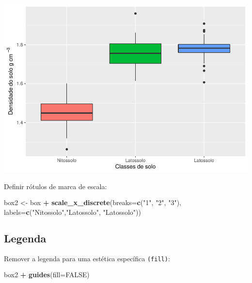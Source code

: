 \documentclass[
]{book}
\newenvironment{Shaded}{\begin{snugshade}}{\end{snugshade}}
\newcommand{\DataTypeTok}[1]{\textcolor[rgb]{0.13,0.29,0.53}{#1}}
\newcommand{\KeywordTok}[1]{\textcolor[rgb]{0.13,0.29,0.53}{\textbf{#1}}}
\newcommand{\NormalTok}[1]{#1}
\newcommand{\OperatorTok}[1]{\textcolor[rgb]{0.81,0.36,0.00}{\textbf{#1}}}
\newcommand{\OtherTok}[1]{\textcolor[rgb]{0.56,0.35,0.01}{#1}}
\newcommand{\StringTok}[1]{\textcolor[rgb]{0.31,0.60,0.02}{#1}}
\begin{document}
\includegraphics{TudodoR_files/figure-latex/unnamed-chunk-208-1.pdf}

Definir rótulos de marca de escala:

\begin{Shaded}
\begin{Highlighting}[]
\NormalTok{box2 <-}\StringTok{ }\NormalTok{box }\OperatorTok{+}
\StringTok{          }\KeywordTok{scale_x_discrete}\NormalTok{(}\DataTypeTok{breaks=}\KeywordTok{c}\NormalTok{(}\StringTok{"1"}\NormalTok{, }\StringTok{"2"}\NormalTok{, }\StringTok{"3"}\NormalTok{),}
            \DataTypeTok{labels=}\KeywordTok{c}\NormalTok{(}\StringTok{"Nitossolo"}\NormalTok{,}\StringTok{"Latossolo"}\NormalTok{, }\StringTok{"Latossolo"}\NormalTok{))}
\end{Highlighting}
\end{Shaded}

\hypertarget{legenda}{%
\subsection{Legenda}\label{legenda}}

Remover a legenda para uma estética específica \texttt{(fill)}:

\begin{Shaded}
\begin{Highlighting}[]
\NormalTok{box2 }\OperatorTok{+}\StringTok{ }\KeywordTok{guides}\NormalTok{(}\DataTypeTok{fill=}\OtherTok{FALSE}\NormalTok{)}
\end{Highlighting}
\end{Shaded}
\end{document}
